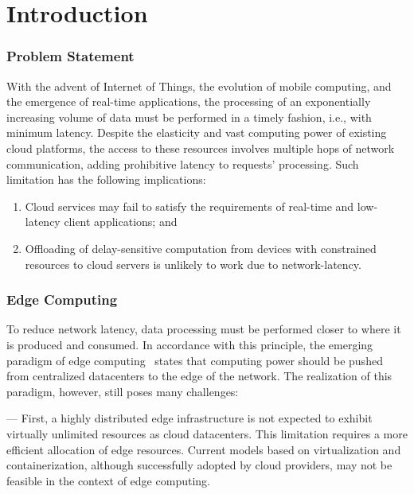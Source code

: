 \section{Introduction}

\subsubsection*{Problem Statement}

With the advent of Internet of Things, the evolution of mobile computing, and the emergence of real-time applications, the processing of an exponentially increasing volume of data must be performed in a timely fashion, i.e., with minimum latency. Despite the elasticity and vast computing power of existing cloud platforms, the access to these resources involves multiple hops of network communication, adding prohibitive latency to requests' processing. Such limitation has the following implications:

\begin{enumerate}

\item Cloud services may fail to satisfy the requirements of real-time and low-latency client applications; and

\item Offloading of delay-sensitive computation from devices with constrained resources to cloud servers is unlikely to work due to network-latency.

\end{enumerate}

\subsubsection*{Edge Computing}

To reduce network latency, data processing must be performed closer to where it is produced and consumed. In accordance with this principle, the emerging paradigm of edge computing~\cite{} states that computing power should be pushed from centralized datacenters to the edge of the network. The realization of this paradigm, however, still poses many challenges:


--- First, a highly distributed edge infrastructure is not expected to exhibit virtually unlimited resources as cloud datacenters. This limitation requires a more efficient allocation of edge resources. Current models based on virtualization and containerization, although successfully adopted by cloud providers, may not be feasible in the context of edge computing.

